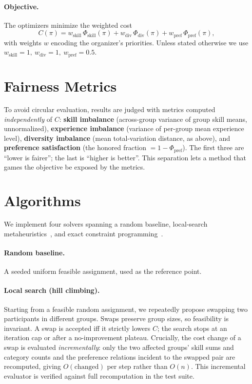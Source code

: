 \documentclass[11pt]{article}
\begin{document}
\paragraph{Objective.} The optimizers minimize the weighted cost
\begin{equation}
\label{eq:cost}
C(\pi)=w_{\text{skill}}\,\Phi_{\text{skill}}(\pi)
       +w_{\text{div}}\,\Phi_{\text{div}}(\pi)
       +w_{\text{pref}}\,\Phi_{\text{pref}}(\pi),
\end{equation}
with weights $w$ encoding the organizer's priorities. Unless stated otherwise we use
$w_{\text{skill}}=1,\ w_{\text{div}}=1,\ w_{\text{pref}}=0.5$.

\section{Fairness Metrics}
\label{sec:metrics}
To avoid circular evaluation, results are judged with metrics computed \emph{independently}
of $C$: \textbf{skill imbalance} (across-group variance of group skill means, unnormalized),
\textbf{experience imbalance} (variance of per-group mean experience level),
\textbf{diversity imbalance} (mean total-variation distance, as above), and
\textbf{preference satisfaction} (the honored fraction $=1-\Phi_{\text{pref}}$). The first
three are ``lower is fairer''; the last is ``higher is better''. This separation lets a
method that games the objective be exposed by the metrics.

\section{Algorithms}
\label{sec:algorithms}
We implement four solvers spanning a random baseline, local-search
metaheuristics~\cite{localsearch,sa}, and exact constraint
programming~\cite{cp}.

\paragraph{Random baseline.} A seeded uniform feasible assignment, used as the reference
point.

\paragraph{Local search (hill climbing).} Starting from a feasible random assignment, we
repeatedly propose swapping two participants in different groups. Swaps preserve group
sizes, so feasibility is invariant. A swap is accepted iff it strictly lowers $C$; the
search stops at an iteration cap or after a no-improvement plateau. Crucially, the cost
change of a swap is evaluated \emph{incrementally}: only the two affected groups' skill
sums and category counts and the preference relations incident to the swapped pair are
recomputed, giving $O(\text{changed})$ per step rather than $O(n)$. This incremental
evaluator is verified against full recomputation in the test suite.
\end{document}

